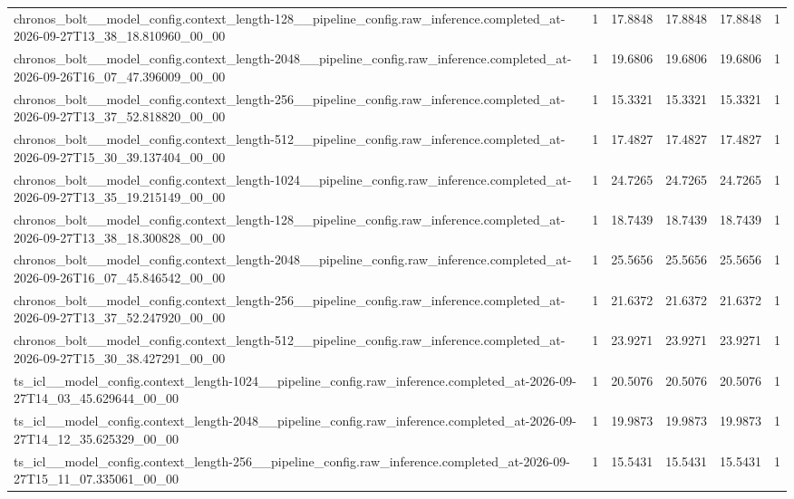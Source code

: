 \begin{tabular}{llllll}
chronos\_bolt\_\_model\_config.context\_length-128\_\_pipeline\_config.raw\_inference.completed\_at-2026-09-27T13\_38\_18.810960\_00\_00 & 1 & 17.8848 & 17.8848 & 17.8848 & 1 \\
chronos\_bolt\_\_model\_config.context\_length-2048\_\_pipeline\_config.raw\_inference.completed\_at-2026-09-26T16\_07\_47.396009\_00\_00 & 1 & 19.6806 & 19.6806 & 19.6806 & 1 \\
chronos\_bolt\_\_model\_config.context\_length-256\_\_pipeline\_config.raw\_inference.completed\_at-2026-09-27T13\_37\_52.818820\_00\_00 & 1 & 15.3321 & 15.3321 & 15.3321 & 1 \\
chronos\_bolt\_\_model\_config.context\_length-512\_\_pipeline\_config.raw\_inference.completed\_at-2026-09-27T15\_30\_39.137404\_00\_00 & 1 & 17.4827 & 17.4827 & 17.4827 & 1 \\
chronos\_bolt\_\_model\_config.context\_length-1024\_\_pipeline\_config.raw\_inference.completed\_at-2026-09-27T13\_35\_19.215149\_00\_00 & 1 & 24.7265 & 24.7265 & 24.7265 & 1 \\
chronos\_bolt\_\_model\_config.context\_length-128\_\_pipeline\_config.raw\_inference.completed\_at-2026-09-27T13\_38\_18.300828\_00\_00 & 1 & 18.7439 & 18.7439 & 18.7439 & 1 \\
chronos\_bolt\_\_model\_config.context\_length-2048\_\_pipeline\_config.raw\_inference.completed\_at-2026-09-26T16\_07\_45.846542\_00\_00 & 1 & 25.5656 & 25.5656 & 25.5656 & 1 \\
chronos\_bolt\_\_model\_config.context\_length-256\_\_pipeline\_config.raw\_inference.completed\_at-2026-09-27T13\_37\_52.247920\_00\_00 & 1 & 21.6372 & 21.6372 & 21.6372 & 1 \\
chronos\_bolt\_\_model\_config.context\_length-512\_\_pipeline\_config.raw\_inference.completed\_at-2026-09-27T15\_30\_38.427291\_00\_00 & 1 & 23.9271 & 23.9271 & 23.9271 & 1 \\
ts\_icl\_\_model\_config.context\_length-1024\_\_pipeline\_config.raw\_inference.completed\_at-2026-09-27T14\_03\_45.629644\_00\_00 & 1 & 20.5076 & 20.5076 & 20.5076 & 1 \\
ts\_icl\_\_model\_config.context\_length-2048\_\_pipeline\_config.raw\_inference.completed\_at-2026-09-27T14\_12\_35.625329\_00\_00 & 1 & 19.9873 & 19.9873 & 19.9873 & 1 \\
ts\_icl\_\_model\_config.context\_length-256\_\_pipeline\_config.raw\_inference.completed\_at-2026-09-27T15\_11\_07.335061\_00\_00 & 1 & 15.5431 & 15.5431 & 15.5431 & 1 \\

\end{tabular}
